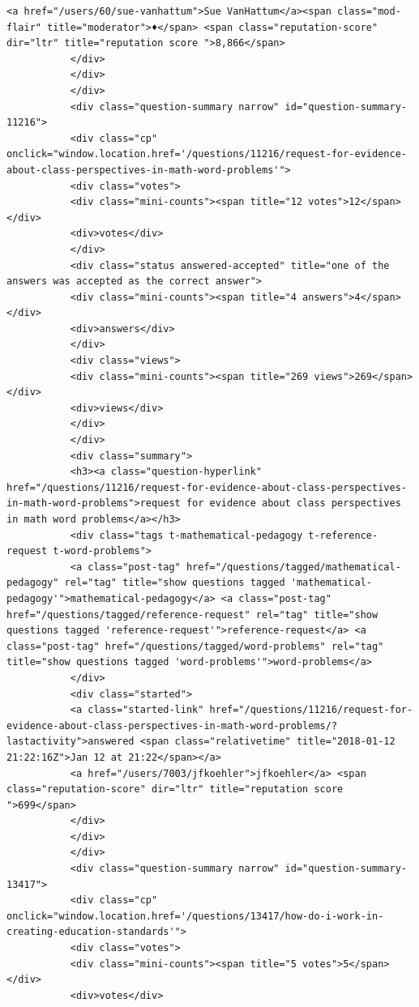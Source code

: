 \documentclass[11pt]{article}
\begin{document}
\begin{Verbatim}[commandchars=\\\{\}]
           <a href="/users/60/sue-vanhattum">Sue VanHattum</a><span class="mod-flair" title="moderator">♦</span> <span class="reputation-score" dir="ltr" title="reputation score ">8,866</span>
           </div>
           </div>
           </div>
           <div class="question-summary narrow" id="question-summary-11216">
           <div class="cp" onclick="window.location.href='/questions/11216/request-for-evidence-about-class-perspectives-in-math-word-problems'">
           <div class="votes">
           <div class="mini-counts"><span title="12 votes">12</span></div>
           <div>votes</div>
           </div>
           <div class="status answered-accepted" title="one of the answers was accepted as the correct answer">
           <div class="mini-counts"><span title="4 answers">4</span></div>
           <div>answers</div>
           </div>
           <div class="views">
           <div class="mini-counts"><span title="269 views">269</span></div>
           <div>views</div>
           </div>
           </div>
           <div class="summary">
           <h3><a class="question-hyperlink" href="/questions/11216/request-for-evidence-about-class-perspectives-in-math-word-problems">request for evidence about class perspectives in math word problems</a></h3>
           <div class="tags t-mathematical-pedagogy t-reference-request t-word-problems">
           <a class="post-tag" href="/questions/tagged/mathematical-pedagogy" rel="tag" title="show questions tagged 'mathematical-pedagogy'">mathematical-pedagogy</a> <a class="post-tag" href="/questions/tagged/reference-request" rel="tag" title="show questions tagged 'reference-request'">reference-request</a> <a class="post-tag" href="/questions/tagged/word-problems" rel="tag" title="show questions tagged 'word-problems'">word-problems</a>
           </div>
           <div class="started">
           <a class="started-link" href="/questions/11216/request-for-evidence-about-class-perspectives-in-math-word-problems/?lastactivity">answered <span class="relativetime" title="2018-01-12 21:22:16Z">Jan 12 at 21:22</span></a>
           <a href="/users/7003/jfkoehler">jfkoehler</a> <span class="reputation-score" dir="ltr" title="reputation score ">699</span>
           </div>
           </div>
           </div>
           <div class="question-summary narrow" id="question-summary-13417">
           <div class="cp" onclick="window.location.href='/questions/13417/how-do-i-work-in-creating-education-standards'">
           <div class="votes">
           <div class="mini-counts"><span title="5 votes">5</span></div>
           <div>votes</div>

\end{Verbatim}
\end{document}
